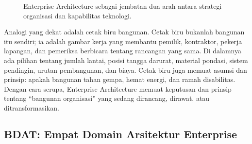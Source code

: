 \begin{figure}[htbp]
\centering
{}
\caption{Enterprise Architecture sebagai jembatan dua arah antara strategi
organisasi dan kapabilitas teknologi.}
\label{fig:ea-jembatan}
\end{figure}

Analogi yang dekat adalah cetak biru bangunan. Cetak biru bukanlah bangunan
itu sendiri; ia adalah gambar kerja yang membantu pemilik, kontraktor, pekerja
lapangan, dan pemeriksa berbicara tentang rancangan yang sama. Di dalamnya ada
pilihan tentang jumlah lantai, posisi tangga darurat, material pondasi, sistem
pendingin, urutan pembangunan, dan biaya. Cetak biru juga memuat asumsi dan
prinsip: apakah bangunan tahan gempa, hemat energi, dan ramah disabilitas.
Dengan cara serupa, Enterprise Architecture memuat keputusan dan prinsip
tentang ``bangunan organisasi'' yang sedang dirancang, dirawat, atau
ditransformasikan.

\subsection{BDAT: Empat Domain Arsitektur Enterprise}

